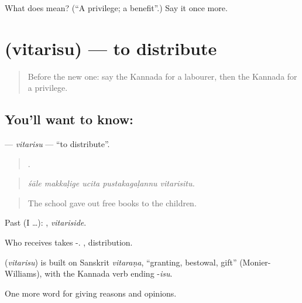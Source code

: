 \begin{tcolorbox}[breakable,colback=teal!4,colframe=teal!35!black,title={Before you move on}]
What does  mean? (\textquotedblleft{}A privilege; a benefit\textquotedblright{}.) Say it once more.
\end{tcolorbox}
\section[\texorpdfstring{\kn{ವಿತರಿಸು} (vitarisu)}{ವಿತರಿಸು (vitarisu)}]{ (vitarisu) — to distribute}

\label{lesson:KA-C399-vitarisu}



\begin{quote}
Before the new one: say the Kannada for a labourer, then the Kannada for a privilege.
\end{quote}

\subsection*{You'll want to know: }
\textbf{} — \emph{vitarisu} — \textquotedblleft{}to distribute\textquotedblright{}.

\begin{quote}
    .
\end{quote}

\begin{quote}
\emph{śāle makkaḷige ucita pustakagaḷannu vitarisitu.}
\end{quote}

\begin{quote}
The school gave out free books to the children.
\end{quote}

Past (I …): , \emph{vitariside}.

Who receives takes -. , distribution.

\begin{cousinweb}
\textbf{} (\emph{vitarisu}) is built on Sanskrit \emph{vitaraṇa}, \textquotedblleft{}granting, bestowal, gift\textquotedblright{} (Monier-Williams), with the Kannada verb ending -\emph{isu}.
\end{cousinweb}

\begin{grammarlens}[title={What you've built}]
One more word for giving reasons and opinions.
\end{grammarlens}

